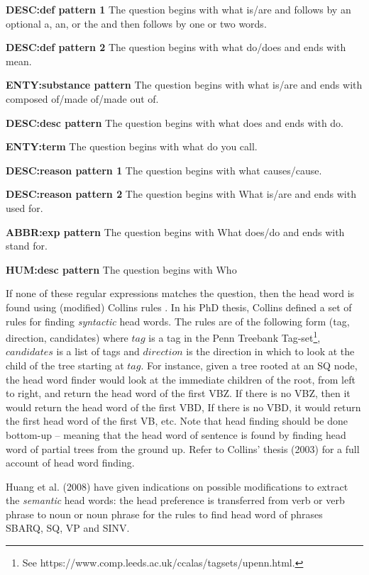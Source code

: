 \documentclass[11pt]{article}
\begin{document}
\small
\textbf{DESC:def pattern 1} The question begins with what is/are and follows by an optional a, an, or the and then follows by one or two words. 

\textbf{DESC:def pattern 2} The question begins with what do/does and ends with mean.

\textbf{ENTY:substance pattern} The question begins with what is/are and ends with composed of/made of/made out of.

\textbf{DESC:desc pattern} The question begins with what does and ends with do.

\textbf{ENTY:term} The question begins with what do you call.

\textbf{DESC:reason pattern 1} The question begins with what causes/cause.

\textbf{DESC:reason pattern 2} The question begins with What is/are and ends with used for.

\textbf{ABBR:exp pattern} The question begins with What does/do and ends with stand for.

\textbf{HUM:desc pattern} The question begins with Who \\

\normalsize

If none of these regular expressions matches the question, then the head word is found using (modified) Collins rules \cite{collins}. In his PhD thesis, Collins defined a set of rules for finding \textit{syntactic} head words. The rules are of the following form (tag, direction, candidates) where $tag$ is a tag in the Penn Treebank Tag-set\footnote{See https://www.comp.leeds.ac.uk/ccalas/tagsets/upenn.html.}, $candidates$ is a list of tags and $direction$ is the direction in which to look at the child of the tree starting at $tag$. For instance, given a tree rooted at an SQ node, the head word finder would look at the immediate children of the root, from left to right, and return the head word of the first VBZ. If there is no VBZ, then it would return the head word of the first VBD, If there is no VBD, it would return the first head word of the first VB, etc. Note that head finding should be done bottom-up -- meaning that the head word of sentence is found by finding head word of partial trees from the ground up. Refer to Collins' thesis (2003) for a full account of head word finding.

Huang et al. (2008) have given indications on possible modifications to extract the \textit{semantic} head words: the head preference is transferred from verb or verb phrase to noun or noun phrase for the rules to find head word of phrases SBARQ, SQ, VP and SINV.
\end{document}
